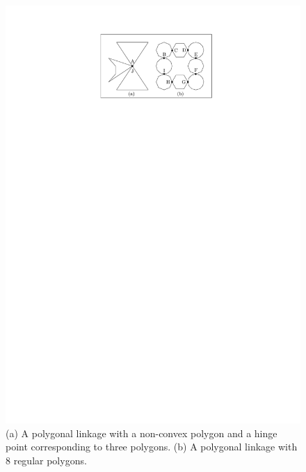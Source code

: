 \begin{figure}[h]
\begin{center}
\includegraphics[scale=1]{graphics/PolygonalLinkageExamples.pdf}
\end{center} 
\caption{(a) A polygonal linkage with a non-convex polygon and a hinge point corresponding to three 
polygons.  (b) A polygonal linkage with 8 regular polygons.}
\label{fig:linkage-2}
\end{figure}


